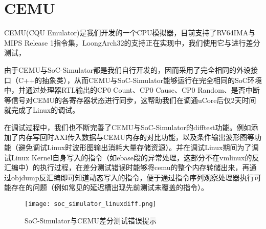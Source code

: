 \section{CEMU}

CEMU(CQU Emulator)是我们开发的一个CPU模拟器，目前支持了RV64IMA与MIPS Release 1指令集，LoongArch32的支持正在实现中，我们使用它与\cpuname 进行差分测试，

由于CEMU与SoC-Simulator都是我们自行开发的，因而采用了完全相同的外设接口（C++的抽象类），从而CEMU与SoC-Simulator能够运行在完全相同的SoC环境中，并通过处理器RTL输出的CP0 Count、CP0 Cause、CP0 Random、是否中断等信号对CEMU的各寄存器状态进行同步，这帮助我们在\cpuname 调通uCore后仅2天时间就完成了Linux的调试。

在\cpuname 调试过程中，我们也不断完善了CEMU与SoC-Simulator的difftest功能。例如添加了内存写回时AXI传入数据与CEMU内存的对比功能，以及条件输出波形图等功能（避免调试Linux时波形图输出消耗大量存储资源）。并在调试Linux期间为了调试Linux Kernel自身写入的指令（如ebase段的异常处理，这部分不在vmlinux的反汇编中）的执行过程，在差分测试错误时能够将cemu的整个内存转储出来，再通过objdump反汇编即可知道动态写入的指令，便于通过指令序列观察处理器执行可能存在的问题（例如常见的延迟槽出现先前测试未覆盖的指令）。

\begin{figure}[h]
    \centering
    \texttt{[image: soc\_simulator\_linuxdiff.png]}
    \caption{SoC-Simulator与CEMU差分测试错误提示}
\end{figure}
